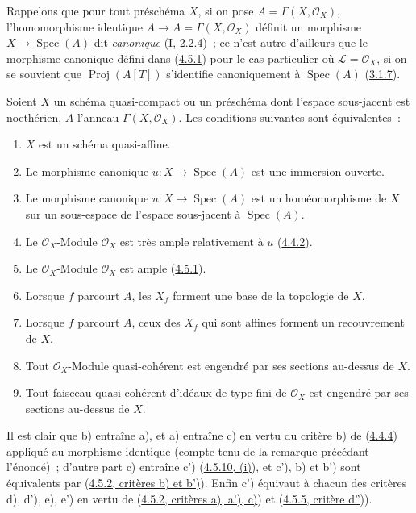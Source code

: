 Rappelons que pour tout préschéma $X$, si on pose
$A=\Gamma(X,\mathcal{O}_X)$, l'homomorphisme identique
$A\to A=\Gamma(X,\mathcal{O}_X)$ définit un morphisme
$X\to\operatorname{Spec}(A)$ dit \emph{canonique}
(\hyperref[I.2.2.4-fr]{I, 2.2.4})~; ce n'est autre d'ailleurs que le morphisme
canonique défini dans (\hyperref[II.4.5.1-fr]{4.5.1}) pour le cas particulier
où $\mathcal{L}=\mathcal{O}_X$, si on se souvient que
$\operatorname{Proj}(A[T])$ s'identifie canoniquement à
$\operatorname{Spec}(A)$ (\hyperref[II.3.1.7-fr]{3.1.7}).

\begin{proposition}[5.1.2]
\label{II.5.1.2-fr}
Soient $X$ un schéma quasi-compact ou un préschéma dont l'espace sous-jacent
est noethérien, $A$ l'anneau $\Gamma(X,\mathcal{O}_X)$. Les conditions
suivantes sont équivalentes~:
\begin{enumerate}
  \item[\rm{a)}] $X$ est un schéma quasi-affine.
  \item[\rm{b)}] Le morphisme canonique
  $u:X\to\operatorname{Spec}(A)$ est une immersion ouverte.
  \item[\rm{b')}] Le morphisme canonique
  $u:X\to\operatorname{Spec}(A)$ est un homéomorphisme de $X$ sur un
  sous-espace de l'espace sous-jacent à $\operatorname{Spec}(A)$.
  \item[\rm{c)}] Le $\mathcal{O}_X$-Module $\mathcal{O}_X$ est très ample
  relativement à $u$ (\hyperref[II.4.4.2-fr]{4.4.2}).
  \item[\rm{c')}] Le $\mathcal{O}_X$-Module $\mathcal{O}_X$ est ample
  (\hyperref[II.4.5.1-fr]{4.5.1}).
  \item[\rm{d)}] Lorsque $f$ parcourt $A$, les $X_f$ forment une base de la
  topologie de $X$.
  \item[\rm{d')}] Lorsque $f$ parcourt $A$, ceux des $X_f$ qui sont affines
  forment un recouvrement de $X$.


  \item[\rm{e)}] Tout $\mathcal{O}_X$-Module quasi-cohérent est engendré par
  ses sections au-dessus de $X$.
  \item[\rm{e')}] Tout faisceau quasi-cohérent d'idéaux de type fini de
  $\mathcal{O}_X$ est engendré par ses sections au-dessus de $X$.
\end{enumerate}
\end{proposition}

Il est clair que b) entraîne a), et a) entraîne c) en vertu du critère b) de
(\hyperref[II.4.4.4-fr]{4.4.4}) appliqué au morphisme identique (compte tenu
de la remarque précédant l'énoncé)~; d'autre part c) entraîne c')
(\hyperref[II.4.5.10-fr]{4.5.10, (i)}), et c'), b) et b') sont équivalents par
(\hyperref[II.4.5.2-fr]{4.5.2, critères b) et b')}). Enfin c') équivaut à
chacun des critères d), d'), e), e') en vertu de
(\hyperref[II.4.5.2-fr]{4.5.2, critères a), a'), c)}) et
(\hyperref[II.4.5.5-fr]{4.5.5, critère d'')}).

